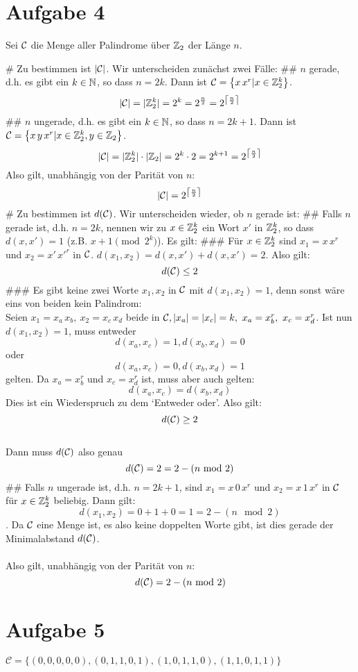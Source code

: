 \section*{Aufgabe 4}
Sei $\mathcal{C}$ die Menge aller Palindrome über $\mathbb{Z}_2$ der Länge $n$. \\
\begin{myList}
# Zu bestimmen ist $|\mathcal{C}|$. Wir unterscheiden zunächst zwei Fälle:
## $n$ gerade, d.h. es gibt ein $k\in\mathbb{N}$, so dass $n=2k$. Dann ist $\mathcal{C}=\left\lbrace x\,x^r|x\in\mathbb{Z}^k_2 \right\rbrace$.
$$|\mathcal{C}| = |\mathbb{Z}^k_2|=2^k=2^{\frac n 2}=2^{\left\lceil\frac n 2\right\rceil}$$
## $n$ ungerade, d.h. es gibt ein $k\in\mathbb{N}$, so dass $n=2k+1$. Dann ist $\mathcal{C}=\left\lbrace x\,y\,x^r|x\in\mathbb{Z}^k_2, y\in\mathbb{Z}_2 \right\rbrace$.
$$|\mathcal{C}| = |\mathbb{Z}^k_2|\cdot|\mathbb{Z}_2|=2^k\cdot 2=2^{k+1}=2^{\left\lceil\frac n 2\right\rceil}$$
Also gilt, unabhängig von der Parität von $n$:
$$|\mathcal{C}|=2^{\left\lceil\frac n 2\right\rceil}$$
# Zu bestimmen ist $d(\mathcal{C})$. Wir unterscheiden wieder, ob $n$ gerade ist:
## Falls $n$ gerade ist, d.h. $n=2k$, nennen wir zu $x\in\mathbb{Z}_2^k$ ein Wort $x'$ in $\mathbb{Z}_2^k$, so dass $d(x, x')=1$ (z.B. $x + 1\pmod {2^k}$). Es gilt:
### Für $x\in\mathbb{Z}_2^k$ sind $x_1=x\,x^r$ und $x_2=x'\,x'^r$ in $\mathcal{C}$. $d(x_1, x_2)=d(x, x')+d(x, x')=2$. Also gilt:
$$d(\mathcal{C})\leq 2$$
### Es gibt keine zwei Worte $x_1, x_2$ in $\mathcal{C}$ mit $d(x_1, x_2)=1$, denn sonst wäre eins von beiden kein Palindrom: \\
Seien $x_1=x_a\,x_b,~x_2=x_c\, x_d$ beide in $\mathcal{C}, |x_a|=|x_c|=k,~x_a=x_b^r,~x_c=x_d^r$. Ist nun $d(x_1, x_2)=1$, muss entweder $$d(x_a, x_c)=1, d(x_b, x_d)=0$$ oder $$d(x_a, x_c)=0, d(x_b, x_d)=1$$ gelten.
Da $x_a=x_b^r$ und $x_c=x_d^r$ ist, muss aber auch gelten:
$$d(x_a, x_c)=d(x_b, x_d)$$
Dies ist ein Wiederspruch zu dem `Entweder oder'. Also gilt:
$$d(\mathcal{C})\geq 2$$
\\Dann muss $d(\mathcal{C})$ also genau
$$d(\mathcal{C})=2=2-(n \text{ mod } 2)$$
## Falls $n$ ungerade ist, d.h. $n=2k+1$, sind $x_1=x\,0\,x^r$ und $x_2=x\,1\,x^r$ in $\mathcal{C}$ für $x\in\mathbb{Z}_2^k$ beliebig. Dann gilt: $$d(x_1, x_2)=0+1+0=1=2- (n\mod 2 )$$. Da $\mathcal{C}$ eine Menge ist, es also keine doppelten Worte gibt, ist dies gerade der Minimalabstand $d(\mathcal{C})$.\\\\
Also gilt, unabhängig von der Parität von $n$:
$$d(\mathcal{C})=2-(n\text{ mod } 2)$$
\end{myList}

\section*{Aufgabe 5}
$\mathcal{C} = \lbrace (0,0,0,0,0) , (0,1,1,0,1) , (1,0,1,1,0) , (1,1,0,1,1) \rbrace$

